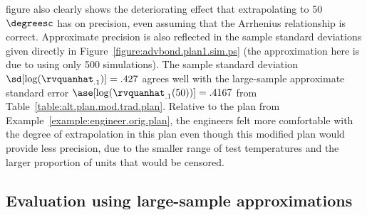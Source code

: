 \begin{example}
figure also clearly shows the deteriorating effect that extrapolating to
50$\degreesc$ has on precision, even assuming that the Arrhenius
relationship is correct.  Approximate precision is also reflected in
the sample standard deviations given directly in  
Figure~\ref{figure:advbond.plan1.sim.ps} (the
approximation here is due to using only 500 simulations). 
The sample standard deviation $\sd[\log(\rvquanhat_{.1})]=.427$
agrees well with the large-sample approximate standard error
$\ase[\log(\rvquanhat_{.1}(50))]= .4167 $ from
Table~\ref{table:alt.plan.mod.trad.plan}. Relative to
the plan from Example~\ref{example:engineer.orig.plan}, the engineers
felt more comfortable with the degree of extrapolation in this plan
even though this modified plan would provide less precision, due to the
smaller range of test temperatures and the larger proportion of units
that would be censored.
\end{example}

\subsection{Evaluation using large-sample approximations}


